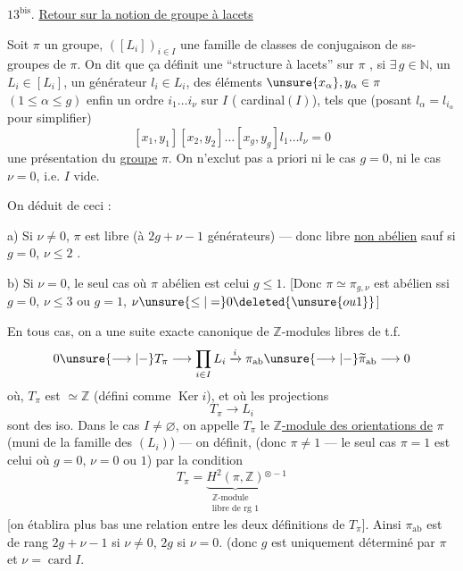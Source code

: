 $13^{\mathrm{bis}}$. \uline{Retour sur la notion de groupe à lacets}

Soit $\pi$ un groupe, $([L_i])_{i\in I}$ une famille
de classes de conjugaison de ss-groupes de
$\pi$. On dit que ça définit une 
``structure à lacets'' sur $\pi$ \inserted{[de type $(g,\nu)$]}, si $\exists\,g\in\mathbb N$,
 un $L_i\in[L_i]$, un générateur
$l_i\in L_i$, des éléments $\unsure{x_\alpha},y_\alpha\in\pi$ $(1\le\alpha\le g)$
enfin un ordre $i_1\dots i_\nu$ sur $I$ ( \inserted{$\nu=$} cardinal$(I)$),
tels que (posant $l_\alpha=l_{i_\alpha}$ pour simplifier)
\[
[x_1,y_1][x_2,y_2]\dots[x_g,y_g]l_1\dots l_\nu=0
\]
 une présentation du \uline{groupe} $\pi$. On
n'exclut pas a priori ni le cas $g=0$, ni le cas $\nu=0$,
i.e. $I$ vide.

On déduit de ceci :

a) Si $\nu\ne0$, $\pi$ est libre (à $2g+\nu-1$ générateurs) ---
donc libre \uline{non abélien} sauf si $g=0$, $\nu\le2$ .


b) Si $\nu=0$, le seul cas où $\pi$ abélien est celui
$g\le1$. [Donc $\pi\simeq\pi_{g,\nu}$ est abélien ssi
$g=0$, $\nu\le3$ ou $g=1$, $\nu\unsure{\le|=}0\deleted{\unsure{ou 1}}$]

En tous cas, on a une suite exacte
canonique de $\mathbb Z$-modules libres de t.f.
\[
0\unsure{\longrightarrow|-}T_\pi\longrightarrow\prod_{i\in I}L_i
\xrightarrow{i}\pi_{\mathrm{ab}}\unsure{\longrightarrow|-}\widetilde\pi_{\mathrm{ab}}\longrightarrow0
\]
où,  $T_\pi$ est $\simeq\mathbb Z$ (défini comme $\operatorname{Ker}i$), et où
les projections
\[
T_\pi\longrightarrow L_i
\]
sont des iso. Dans le cas $I\ne\varnothing$, on
appelle $T_\pi$ le \uline{$\mathbb Z$-module des orientations de}
$\pi$ (muni de la famille des $(L_i)$) ---
on définit,  
(donc $\pi\ne1$ --- le seul cas $\pi=1$ est celui où
$g=0$, $\nu=0$ ou $1$) par la condition
\[
T_\pi=\underbrace{H^2(\pi,\mathbb Z)}_{\substack{\mathbb Z\text{-module}\\\text{libre de rg }1}}{}^{\otimes-1}
\]
[on établira plus bas une relation entre les
deux définitions de $T_\pi$]. Ainsi $\pi_{\mathrm{ab}}$
est  de rang $2g+\nu-1$ si $\nu\ne0$, $2g$ si $\nu=0$.
(donc $g$ est uniquement déterminé par $\pi$ et $\nu=\operatorname{card}I$.

